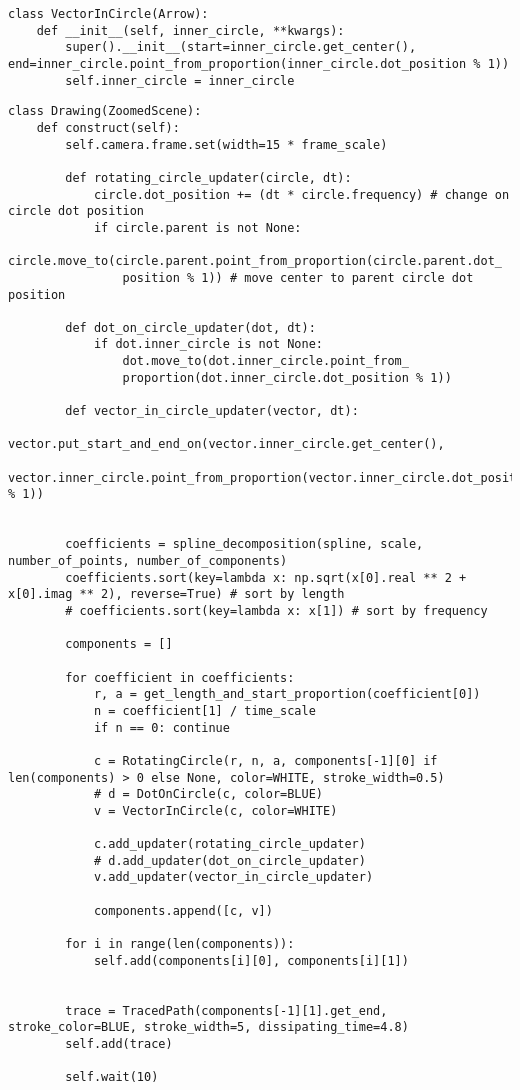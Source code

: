 \begin{lstlisting}[style=python_white, label=lst:vector_in_cicle, caption={Исходный код класса вектора внутри окружности}]
class VectorInCircle(Arrow):
    def __init__(self, inner_circle, **kwargs):
        super().__init__(start=inner_circle.get_center(), end=inner_circle.point_from_proportion(inner_circle.dot_position % 1))
        self.inner_circle = inner_circle
\end{lstlisting}


\begin{lstlisting}[style=python_white, caption={Исходрый код основного класса анимации}, label=lst:manim]
class Drawing(ZoomedScene):
    def construct(self):
        self.camera.frame.set(width=15 * frame_scale)

        def rotating_circle_updater(circle, dt):
            circle.dot_position += (dt * circle.frequency) # change on circle dot position 
            if circle.parent is not None:
                circle.move_to(circle.parent.point_from_proportion(circle.parent.dot_
                position % 1)) # move center to parent circle dot position 

        def dot_on_circle_updater(dot, dt):
            if dot.inner_circle is not None:
                dot.move_to(dot.inner_circle.point_from_
                proportion(dot.inner_circle.dot_position % 1))

        def vector_in_circle_updater(vector, dt):
            vector.put_start_and_end_on(vector.inner_circle.get_center(),
             vector.inner_circle.point_from_proportion(vector.inner_circle.dot_position % 1))


        coefficients = spline_decomposition(spline, scale, number_of_points, number_of_components)
        coefficients.sort(key=lambda x: np.sqrt(x[0].real ** 2 + x[0].imag ** 2), reverse=True) # sort by length
        # coefficients.sort(key=lambda x: x[1]) # sort by frequency 

        components = []

        for coefficient in coefficients:
            r, a = get_length_and_start_proportion(coefficient[0])
            n = coefficient[1] / time_scale
            if n == 0: continue

            c = RotatingCircle(r, n, a, components[-1][0] if len(components) > 0 else None, color=WHITE, stroke_width=0.5)
            # d = DotOnCircle(c, color=BLUE)
            v = VectorInCircle(c, color=WHITE)

            c.add_updater(rotating_circle_updater)
            # d.add_updater(dot_on_circle_updater)
            v.add_updater(vector_in_circle_updater)

            components.append([c, v])

        for i in range(len(components)):
            self.add(components[i][0], components[i][1])
            

        trace = TracedPath(components[-1][1].get_end, stroke_color=BLUE, stroke_width=5, dissipating_time=4.8)
        self.add(trace)

        self.wait(10) 
\end{lstlisting}